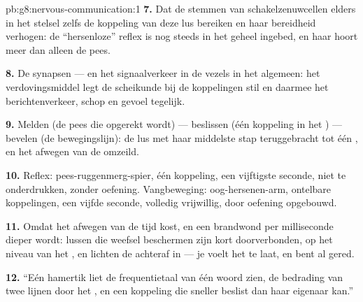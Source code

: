 \begin{solution}{pb:g8:nervous-communication:1}
\textbf{7.} Dat de stemmen van schakelzenuwcellen elders in het stelsel
zelfs de koppeling van deze lus bereiken en haar bereidheid verhogen: de
``hersenloze'' reflex is nog steeds in het geheel ingebed, en haar 
hoort meer dan alleen de pees.

\textbf{8.} De synapsen --- en het signaalverkeer in de vezels in het
algemeen: het verdovingsmiddel legt de scheikunde bij de koppelingen stil
en daarmee het berichtenverkeer, schop en gevoel tegelijk.

\textbf{9.} Melden (de pees die opgerekt wordt) --- beslissen (één
koppeling in het ) --- bevelen (de bewegingslijn): de lus met
haar middelste stap teruggebracht tot één , en het afwegen van de
 omzeild.

\textbf{10.} Reflex: pees-ruggenmerg-spier, één koppeling, een vijftigste
seconde, niet te onderdrukken, zonder oefening. Vangbeweging:
oog-hersenen-arm, ontelbare koppelingen, een vijfde seconde, volledig
vrijwillig, door oefening opgebouwd.

\textbf{11.} Omdat het afwegen van de  tijd kost, en een
brandwond per milliseconde dieper wordt: lussen die weefsel beschermen
zijn kort doorverbonden, op het niveau van het , en lichten de
 achteraf in --- je voelt het te laat, en bent al gered.

\textbf{12.} ``Eén hamertik liet de frequentietaal van één woord zien, de
bedrading van twee lijnen door het , en een koppeling die
sneller beslist dan haar eigenaar kan.''
\end{solution}
